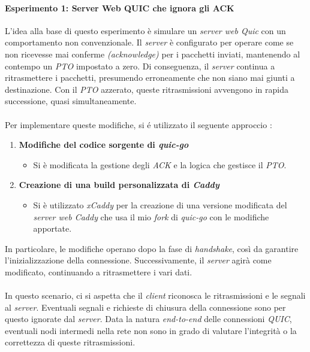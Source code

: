 \paragraph{Esperimento 1: Server Web QUIC che ignora gli ACK}
\label{esperimento1}
\noindent L'idea alla base di questo esperimento è simulare un \emph{server web Quic} con un comportamento non convenzionale. 
Il \emph{server} è configurato per operare come se non ricevesse mai conferme \emph{(acknowledge)} per i pacchetti inviati, mantenendo al contempo un \emph{PTO} impostato a zero. 
Di conseguenza, il \emph{server} continua a ritrasmettere i pacchetti, presumendo erroneamente che non siano mai giunti a destinazione. Con il \emph{PTO} azzerato, queste ritrasmissioni avvengono in rapida successione, quasi simultaneamente.
\\\\
Per implementare queste modifiche, si é utilizzato il seguente approccio : 
\begin{enumerate}[label=\roman*]
    \item \textbf{Modifiche del codice sorgente di \emph{quic-go}}
    \begin{itemize}
        \item Si è modificata la gestione degli \emph{ACK} e la logica che gestisce il \emph{PTO}.
    \end{itemize}
    \item \textbf{Creazione di una build personalizzata di \emph{Caddy}}
    \begin{itemize}
        \item Si è utilizzato \emph{xCaddy} per la creazione di una versione modificata del \emph{server web Caddy} che usa il mio \emph{fork} di \emph{quic-go} con le modifiche apportate.
    \end{itemize}
\end{enumerate}
In particolare, le modifiche operano dopo la fase di \emph{handshake}, così da garantire l'inizializzazione della connessione. Successivamente, il \emph{server} agirà come modificato, continuando a ritrasmettere i vari dati.
\\\\
In questo scenario, ci si aspetta che il \emph{client} riconosca le ritrasmissioni e le segnali al \emph{server}. Eventuali segnali e richieste di chiusura della connessione sono per questo ignorate dal \emph{server}.
Data la natura \emph{end-to-end} delle connessioni \emph{QUIC}, eventuali nodi intermedi nella rete non sono in grado di valutare l'integrità o la correttezza di queste ritrasmissioni.
